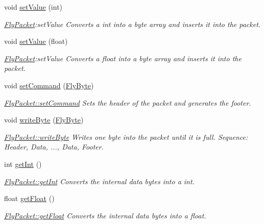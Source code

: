 \begin{DoxyCompactItemize}
void \hyperlink{class_fly_packet_ab3d6f9ed138f3938dc97a510e050f1dc}{set\+Value} (int)
\begin{DoxyCompactList}\small\item\em \hyperlink{class_fly_packet}{Fly\+Packet}\+:set\+Value Converts a int into a byte array and inserts it into the packet. \end{DoxyCompactList}\item 
void \hyperlink{class_fly_packet_a4735fdfc7443640f35b298f5798aab99}{set\+Value} (float)
\begin{DoxyCompactList}\small\item\em \hyperlink{class_fly_packet}{Fly\+Packet}\+:set\+Value Converts a float into a byte array and inserts it into the packet. \end{DoxyCompactList}\item 
void \hyperlink{class_fly_packet_aa0693a87a15559c8d88613463805c532}{set\+Command} (\hyperlink{conversions_8h_a1f006e31a957accfe6aa1bf6f401efce}{Fly\+Byte})
\begin{DoxyCompactList}\small\item\em \hyperlink{class_fly_packet_aa0693a87a15559c8d88613463805c532}{Fly\+Packet\+::set\+Command} Sets the header of the packet and generates the footer. \end{DoxyCompactList}\item 
void \hyperlink{class_fly_packet_ad0296d3260b26f33eb384dbf5421277a}{write\+Byte} (\hyperlink{conversions_8h_a1f006e31a957accfe6aa1bf6f401efce}{Fly\+Byte})
\begin{DoxyCompactList}\small\item\em \hyperlink{class_fly_packet_ad0296d3260b26f33eb384dbf5421277a}{Fly\+Packet\+::write\+Byte} Writes one byte into the packet until it is full. Sequence\+: Header, Data, ..., Data, Footer. \end{DoxyCompactList}\item 
int \hyperlink{class_fly_packet_a0a24a69f5c318d9579fac40ad5c7b502}{get\+Int} ()
\begin{DoxyCompactList}\small\item\em \hyperlink{class_fly_packet_a0a24a69f5c318d9579fac40ad5c7b502}{Fly\+Packet\+::get\+Int} Converts the internal data bytes into a int. \end{DoxyCompactList}\item 
float \hyperlink{class_fly_packet_a8987702368547e049b1f7ab8e979ce91}{get\+Float} ()
\begin{DoxyCompactList}\small\item\em \hyperlink{class_fly_packet_a8987702368547e049b1f7ab8e979ce91}{Fly\+Packet\+::get\+Float} Converts the internal data bytes into a float. \end{DoxyCompactList}\item 

\end{DoxyCompactItemize}
